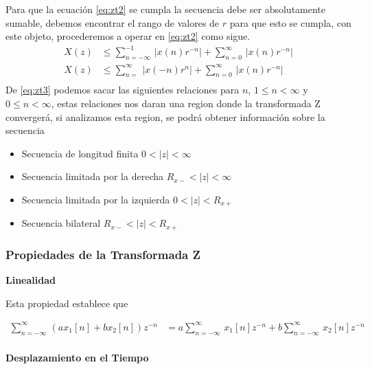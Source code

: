 \documentclass[12pt]{article}
\begin{document}
Para que la ecuación \ref{eq:zt2} se cumpla la secuencia debe ser absolutamente sumable, debemos encontrar el rango de valores de $r$ para que esto se cumpla, con este objeto, procederemos a operar en \ref{eq:zt2} como sigue.
\begin{equation}
    \begin{split}
        X(z)&\leq\displaystyle\sum_{n=-\infty}^{-1}\,|x(n)r^{-n}|+\displaystyle\sum_{n=0}^\infty\,|x(n)r^{-n}|\\
        X(z)&\leq\displaystyle\sum_{n=}^\infty\,|x(-n)r^{n}|+\displaystyle\sum_{n=0}^\infty\,|x(n)r^{-n}|\\
    \end{split}
    \label{eq:zt3}
\end{equation}
De \ref{eq:zt3} podemos sacar las siguientes relaciones para $n$, $1\leq n<\infty$ y $0\leq n<\infty$, estas relaciones nos daran una region donde la transformada Z convergerá, si analizamos esta region, se podrá obtener información sobre la secuencia
\begin{itemize}
    \item Secuencia de longitud finita $0<|z|<\infty$
    \item Secuencia limitada por la derecha $R_{x-}<|z|<\infty$
    \item Secuencia limitada por la izquierda $0<|z|<R_{x+}$
    \item Secuencia bilateral $R_{x-}<|z|<R_{x+}$     
\end{itemize}
\subsubsection{Propiedades de la Transformada Z}
\textbf{Linealidad}
\vspace{5mm}

Esta propiedad establece que\par

\begin{equation}
    \begin{split}
        \displaystyle\sum_{n=-\infty}^{\infty}\,(ax_{1}[n]+bx_{2}[n])z^{-n}&=a\displaystyle\sum_{n=-\infty}^{\infty}\,x_{1}[n]z^{-n}+b\displaystyle\sum_{n=-\infty}^{\infty}\,x_{2}[n]z^{-n}\\
    \end{split}
    \label{eq:lineal}
\end{equation}

\textbf{Desplazamiento en el Tiempo}
\vspace{5mm}
\end{document}
